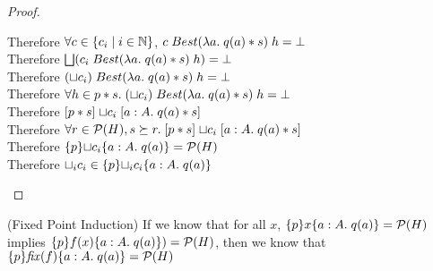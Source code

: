 \begin{proof}
\begin{tabbedproof}
\ooooo Therefore $\forall c \in \{{{c_i}\;|\;{i \in \mathbb{N}}}\}$, $c\;Best(\lambda a.\;q(a)*s)\;h = \bot$ \\
\ooooo Therefore $\bigsqcup (c_i\;Best(\lambda a.\;q(a)*s)\;h) = \bot$ \\
\ooooo Therefore $(\sqcup c_i)\;Best(\lambda a.\;q(a)*s)\;h = \bot$ \\
\oooo Therefore $\forall h \in p * s.\; (\sqcup c_i)\; Best(\lambda a.\;q(a)*s)\;h = \bot$ \\
\oooo Therefore $[{p * s}]\;{\sqcup c_i}\;[{a:A}.\;{q(a) * s}]$ \\
\ooo Therefore $\forall r \in \mathcal{P}(H), s \succeq r.\; 
                   [{p * s}]\;{\sqcup c_i}\;[{a:A}.\;{q(a) * s}]$ \\
\ooo Therefore $\{{p}\}{\sqcup c_i}\{{a:A}.\;{q(a)}\} = \mathcal{P}(H)$ \\
\ooo Therefore $\sqcup_i c_i \in \{{p}\}{\sqcup_i c_i}\{{a:A}.\;{q(a)}\}$ \\
\end{tabbedproof}
\end{proof}

\begin{lemma}{(Fixed Point Induction)}
If we know that for all $x$, $\{{p}\}{x}\{{a:A}.\;{q(a)}\} = \mathcal{P}(H)$ implies $\{{p}\}{f(x)}\{{a:A}.\;{q(a)}\}) = \mathcal{P}(H)$, then we know that $\{{p}\}{\mathit{fix}(f)}\{{a:A}.\;{q(a)}\} = \mathcal{P}(H)$
\end{lemma}

